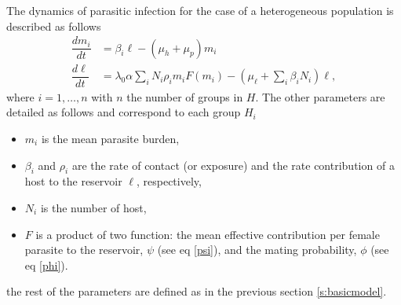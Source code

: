 \documentclass[eng]{MMSB-class-eng}
\begin{document}
{%
%	
%	
%	
The dynamics of parasitic infection for the case of a heterogeneous population is described as follows
\begin{equation}\label{model2}
\begin{split}
\dfrac{dm_i}{dt}&=\beta_i \ell - (\mu_h+\mu_p) m_i\\
\dfrac{d\ell}{dt}&= 
\lambda_0 \alpha
\sum_i  N_i \rho_i  m_i F(m_i)   - (\mu_{\ell}+\sum_i \beta_i N_i ) \ell ,
\end{split}
\end{equation} 
where $i=1,\ldots,n$ with $n$ the number of groups in $H$.     
The other parameters are detailed as follows and correspond to each group $H_i$
\begin{itemize}
	\item $m_i$ is the mean parasite burden,
	\item $\beta_i$ and $\rho_i$  are the rate of contact (or exposure) and the rate contribution
	of a host to the reservoir $\ell$, respectively,
	\item $N_{i}$ is the number of host,
	\item $F$ is a product of two function: the mean effective contribution per female parasite to the reservoir, $\psi$ (see eq \eqref{psi}), and the mating probability, $\phi$ (see eq \eqref{phi}).  
\end{itemize}
the rest of the parameters are defined as in the previous section \ref{s:basicmodel}.
}
\end{document}
